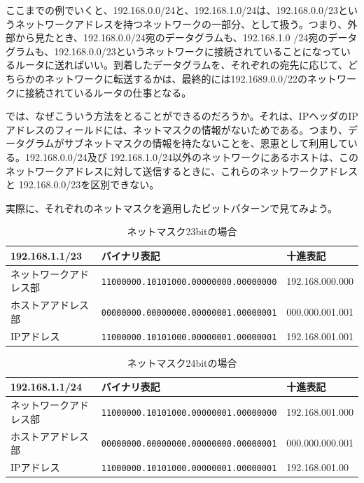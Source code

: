 ここまでの例でいくと、192.168.0.0/24と、192.168.1.0/24は、192.168.0.0/23というネットワークアドレスを持つネットワークの一部分、として扱う。つまり、外部から見たとき、192.168.0.0/24宛のデータグラムも、192.168.1.0 /24宛のデータグラムも、192.168.0.0/23というネットワークに接続されていることになっているルータに送ればいい。到着したデータグラムを、それぞれの宛先に応じて、どちらかのネットワークに転送するかは、最終的には192.1689.0.0/22のネットワークに接続されているルータの仕事となる。

では、なぜこういう方法をとることができるのだろうか。それは、IPヘッダのIPアドレスのフィールドには、ネットマスクの情報がないためである。つまり、データグラムがサブネットマスクの情報を持たないことを、恩恵として利用している。192.168.0.0/24及び 192.168.1.0/24以外のネットワークにあるホストは、このネットワークアドレスに対して送信するときに、これらのネットワークアドレスと 192.168.0.0/23を区別できない。

実際に、それぞれのネットマスクを適用したビットパターンで見てみよう。

\begin{table}[hbtp] \caption{ネットマスク23bitの場合} \label{mask23}
\begin{center}
{\footnotesize
\begin{tabular}{lll} \toprule
192.168.1.1/23 & バイナリ表記 & 十進表記\\ \midrule
ネットワークアドレス部 & \verb+11000000.10101000.00000000.00000000+ &192.168.000.000\\
ホストアアドレス部 & \verb+00000000.00000000.00000001.00000001+ & 000.000.001.001\\
IPアドレス & \verb+11000000.10101000.00000001.00000001+ & 192.168.001.001\\ \bottomrule
\end{tabular}
}
\end{center}
\end{table}

\begin{table}[hbtp] \caption{ネットマスク24bitの場合} \label{mask24}
\begin{center}
{\footnotesize
\begin{tabular}{lll} \toprule
192.168.1.1/24 & バイナリ表記 & 十進表記\\ \midrule
ネットワークアドレス部 & \verb+11000000.10101000.00000001.00000000+ & 192.168.001.000\\
ホストアアドレス部 & \verb+00000000.00000000.00000000.00000001+ & 000.000.000.001\\
IPアドレス & \verb+11000000.10101000.00000001.00000001+ & 192.168.001.00\\ \bottomrule
\end{tabular}
}
\end{center}
\end{table}

